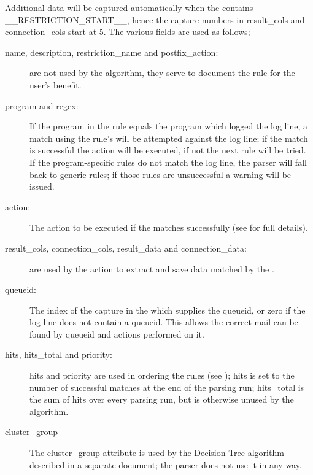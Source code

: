 Additional data will be captured automatically when the \regex{} contains 
\_\_RESTRICTION\_START\_\_, hence the capture numbers in result\_cols and
connection\_cols start at 5.  The various fields are used as follows;

\begin{description}

    \item [name, description, restriction\_name and postfix\_action:] are
        not \newline used by the algorithm, they serve to document the rule
        for the user's benefit.

    \item [program and regex:] If the program in the rule equals the
        program which logged the log line, a match using the rule's
        \regex{} will be attempted against the log line; if the match is
        successful the action will be executed, if not the next rule will
        be tried.  If the program-specific rules do not match the log line,
        the parser will fall back to generic rules; if those rules are
        unsuccessful a warning will be issued.

    \item [action:] The action to be executed if the \regex{} matches
        successfully (see  for full details).

    \item [result\_cols, connection\_cols, result\_data and
        connection\_data:] are \newline used by the action to extract and
        save data matched by the \regex{}.

    \item [queueid:] The index of the capture in the \regex{} which
        supplies the queueid, or zero if the log line does not contain a
        queueid.  This allows the correct mail can be found by queueid and
        actions performed on it.

    \item [hits, hits\_total and priority:] hits and priority are used in
        ordering the rules (see );
        hits is set to the number of successful matches at the end of the
        parsing run; hits\_total is the sum of hits over every parsing run,
        but is otherwise unused by the algorithm.

    \item [cluster\_group] The cluster\_group attribute is used by the
        Decision Tree algorithm described in a separate document; the
        parser does not use it in any way.

\end{description}



